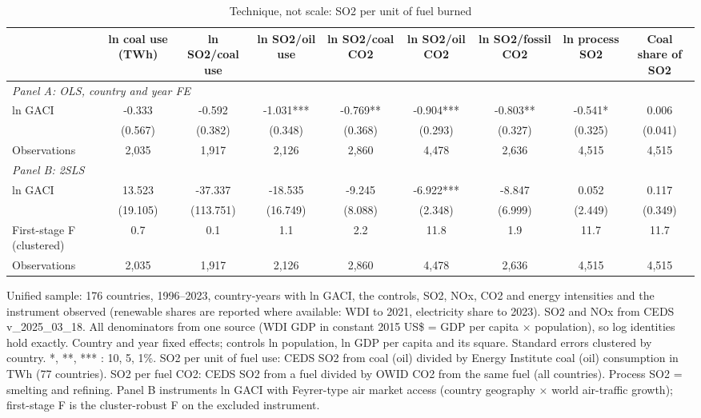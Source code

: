 \begin{table}[htbp]\centering\small
\caption{Technique, not scale: SO2 per unit of fuel burned}\label{tab:T2}
\begin{tabular}{lcccccccc}
\toprule
 & ln coal use (TWh) & ln SO2/coal use & ln SO2/oil use & ln SO2/coal CO2 & ln SO2/oil CO2 & ln SO2/fossil CO2 & ln process SO2 & Coal share of SO2 \\
\midrule
\midrule
\multicolumn{9}{l}{\textit{Panel A: OLS, country and year FE}} \\
ln GACI & -0.333 & -0.592 & -1.031*** & -0.769** & -0.904*** & -0.803** & -0.541* & 0.006 \\
 & (0.567) & (0.382) & (0.348) & (0.368) & (0.293) & (0.327) & (0.325) & (0.041) \\
\midrule
Observations & 2,035 & 1,917 & 2,126 & 2,860 & 4,478 & 2,636 & 4,515 & 4,515 \\
\midrule
\multicolumn{9}{l}{\textit{Panel B: 2SLS}} \\
ln GACI & 13.523 & -37.337 & -18.535 & -9.245 & -6.922*** & -8.847 & 0.052 & 0.117 \\
 & (19.105) & (113.751) & (16.749) & (8.088) & (2.348) & (6.999) & (2.449) & (0.349) \\
First-stage F (clustered) & 0.7 & 0.1 & 1.1 & 2.2 & 11.8 & 1.9 & 11.7 & 11.7 \\
\midrule
Observations & 2,035 & 1,917 & 2,126 & 2,860 & 4,478 & 2,636 & 4,515 & 4,515 \\
\bottomrule
\end{tabular}
\begin{minipage}{0.95\textwidth}\footnotesize Unified sample: 176 countries, 1996--2023, country-years with ln GACI, the controls, SO2, NOx, CO2 and energy intensities and the instrument observed (renewable shares are reported where available: WDI to 2021, electricity share to 2023). SO2 and NOx from CEDS v\_2025\_03\_18. All denominators from one source (WDI GDP in constant 2015 US\$ = GDP per capita $\times$ population), so log identities hold exactly. Country and year fixed effects; controls ln population, ln GDP per capita and its square. Standard errors clustered by country. *, **, *** : 10, 5, 1\%. SO2 per unit of fuel use: CEDS SO2 from coal (oil) divided by Energy Institute coal (oil) consumption in TWh (77 countries). SO2 per fuel CO2: CEDS SO2 from a fuel divided by OWID CO2 from the same fuel (all countries). Process SO2 = smelting and refining. Panel B instruments ln GACI with Feyrer-type air market access (country geography $\times$ world air-traffic growth); first-stage F is the cluster-robust F on the excluded instrument.\end{minipage}
\end{table}